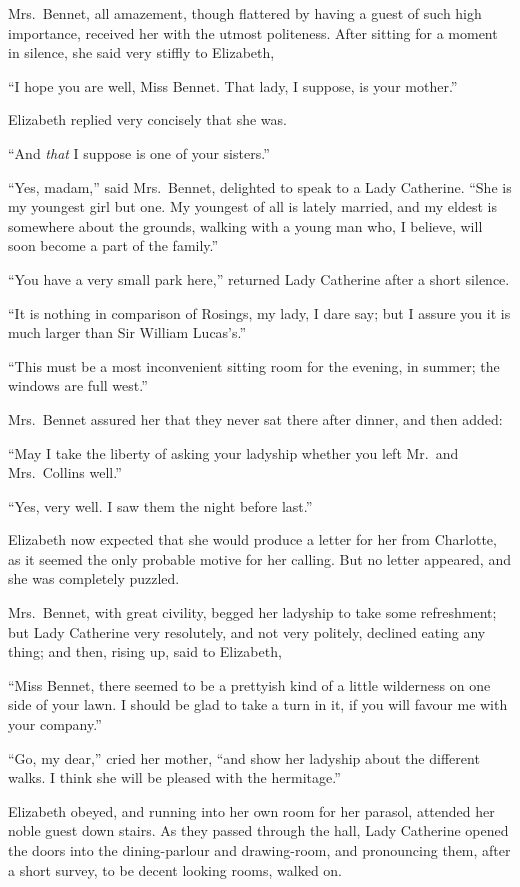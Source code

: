 \documentclass[12pt,english,oneside]{book}
\begin{document}
Mrs.\ Bennet, all amazement, though flattered by having a guest of
such high importance, received her with the utmost politeness. After
sitting for a moment in silence, she said very stiffly to Elizabeth,

{}``I hope you are well, Miss Bennet. That lady, I suppose, is your
mother.''

Elizabeth replied very concisely that she was.

{}``And \textit{that} I suppose is one of your sisters.''

{}``Yes, madam,'' said Mrs.\ Bennet, delighted to speak to a Lady
Catherine. {}``She is my youngest girl but one. My youngest of all
is lately married, and my eldest is somewhere about the grounds, walking
with a young man who, I believe, will soon become a part of the family.''

{}``You have a very small park here,'' returned Lady Catherine after
a short silence.

{}``It is nothing in comparison of Rosings, my lady, I dare say;
but I assure you it is much larger than Sir William Lucas's.''

{}``This must be a most inconvenient sitting room for the evening,
in summer; the windows are full west.''

Mrs.\ Bennet assured her that they never sat there after dinner,
and then added:

{}``May I take the liberty of asking your ladyship whether you left
Mr.\ and Mrs.\ Collins well.''

{}``Yes, very well. I saw them the night before last.''

Elizabeth now expected that she would produce a letter for her from
Charlotte, as it seemed the only probable motive for her calling.
But no letter appeared, and she was completely puzzled.

Mrs.\ Bennet, with great civility, begged her ladyship to take some
refreshment; but Lady Catherine very resolutely, and not very politely,
declined eating any thing; and then, rising up, said to Elizabeth,

{}``Miss Bennet, there seemed to be a prettyish kind of a little
wilderness on one side of your lawn. I should be glad to take a turn
in it, if you will favour me with your company.''

{}``Go, my dear,'' cried her mother, {}``and show her ladyship
about the different walks. I think she will be pleased with the hermitage.''

Elizabeth obeyed, and running into her own room for her parasol, attended
her noble guest down stairs. As they passed through the hall, Lady
Catherine opened the doors into the dining-parlour and drawing-room,
and pronouncing them, after a short survey, to be decent looking rooms,
walked on.
\end{document}
